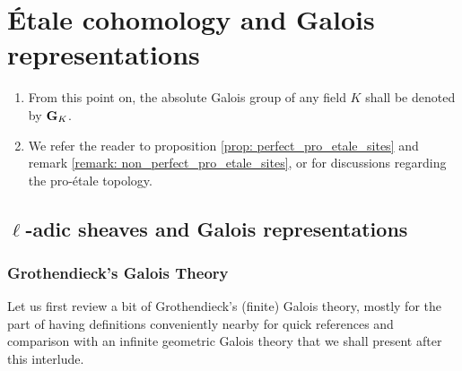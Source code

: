 \chapter{\'Etale cohomology and Galois representations}
    \begin{abstract}
        
    \end{abstract}
    
    \minitoc
    
    \begin{convention}
        \noindent
        \begin{enumerate}
            \item From this point on, the absolute Galois group of any field $K$ shall be denoted by $\mathbf{G}_K$. 
            \item We refer the reader to proposition \ref{prop: perfect_pro_etale_sites} and remark \ref{remark: non_perfect_pro_etale_sites}, or \cite[Definition 4.1.1 and Remark 4.1.3]{bhatt_scholze_2014_pro_etale} for discussions regarding the pro-\'etale topology.
        \end{enumerate}
    \end{convention}
    
    \section{\texorpdfstring{$\ell$}{}-adic sheaves and Galois representations}
        \subsection{Grothendieck's Galois Theory} \label{subsection: grothendieck_galois_theory}
            Let us first review a bit of Grothendieck's (finite) Galois theory, mostly for the part of having definitions conveniently nearby for quick references and comparison with an infinite geometric Galois theory that we shall present after this interlude.
            
